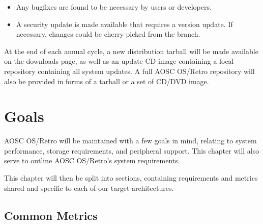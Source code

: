     \begin{itemize}
        \item Any bugfixes are found to be necessary by users or developers.
        \item A security update is made available that requires a version update.
            If necessary, changes could be cherry-picked from the  branch.
    \end{itemize}

    At the end of each annual cycle, a new distribution tarball will be made available on the downloads page, as well as an update CD image containing a local repository containing all system updates. A full AOSC OS/Retro repository will also be provided in forms of a tarball or a set of CD/DVD image.



    \chapter{Goals}

    AOSC OS/Retro will be maintained with a few goals in mind, relating to system performance, storage requirements, and peripheral support. This chapter will also serve to outline AOSC OS/Retro's system requirements.

    This chapter will then be split into sections, containing requirements and metrics shared and specific to each of our target architectures.

    \section{Common Metrics}

